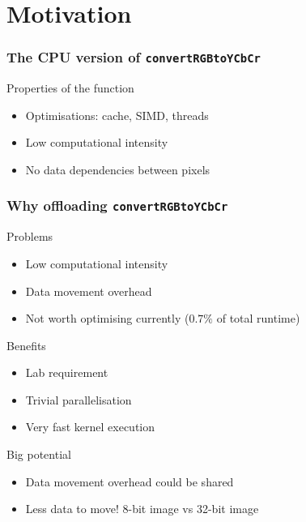 \section{Motivation}
\begin{frame}[fragile]
  \frametitle{The CPU version of \lstinline{convertRGBtoYCbCr}}
   \pause{}
  \begin{alertblock}{Properties of the function}
    \begin{itemize}
    \item Optimisations: cache, SIMD, threads
    \item Low computational intensity
    \item No data dependencies between pixels
    \end{itemize}
  \end{alertblock}
\end{frame}

\begin{frame}
  \frametitle{Why offloading \lstinline{convertRGBtoYCbCr}}
  \pause{}
  \begin{block}{Problems}
    \begin{itemize}
    \item Low computational intensity
    \item Data movement overhead
    \item Not worth optimising currently (\(0.7\%\) of total runtime)
    \end{itemize}
  \end{block}
  \pause{}
  \begin{block}{Benefits}
    \begin{itemize}
    \item Lab requirement
    \item Trivial parallelisation
    \item Very fast kernel execution
    \end{itemize}
  \end{block}
  \pause{}
  \begin{alertblock}{Big potential}
    \begin{itemize}
    \item Data movement overhead could be shared
    \item Less data to move! 8-bit image vs 32-bit image
    \end{itemize}
  \end{alertblock}
\end{frame}

